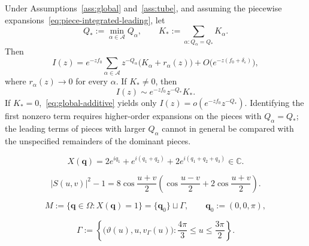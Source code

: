 \documentclass[10pt,a4paper]{amsart}
\newcommand{\C}{\mathbb{C}}
\newcommand{\cA}{\mathcal{A}}
\newcommand{\eps}{\varepsilon}
\begin{document}
\begin{theorem}\label{thm:global-leading}
Under Assumptions~\ref{ass:global} and~\ref{ass:tube}, and assuming the
piecewise expansions~\eqref{eq:piece-integrated-leading}, let
\begin{equation}\label{eq:Qstar}
  Q_*:=\min_{\alpha\in\cA}Q_\alpha,
  \qquad
  K_*:=\sum_{\alpha:Q_\alpha=Q_*}K_\alpha.
\end{equation}
Then
\begin{equation}\label{eq:global-additive}
 I(z)=e^{-zf_0}\sum_{\alpha\in\cA}
 z^{-Q_\alpha}\bigl(K_\alpha+r_\alpha(z)\bigr)
 +O\bigl(e^{-z(f_0+\delta_\eps)}\bigr),
\end{equation}
where $r_\alpha(z)\to0$ for every $\alpha$.  If $K_*\ne0$, then
\begin{equation}\label{eq:global-equivalence}
  I(z)\sim e^{-zf_0}z^{-Q_*}K_*.
\end{equation}
If $K_*=0$,~\eqref{eq:global-additive} yields only
$I(z)=o(e^{-zf_0}z^{-Q_*})$.  Identifying the first nonzero term requires
higher-order expansions on the pieces with $Q_\alpha=Q_*$; the leading
terms of pieces with larger $Q_\alpha$ cannot in general be compared with
the unspecified remainders of the dominant pieces.
\end{theorem}

\begin{equation}\label{eq:robot-forward-map}
 X(\bm q)
 =2e^{iq_1}+e^{i(q_1+q_2)}+2e^{i(q_1+q_2+q_3)}\in\C.
\end{equation}

\begin{equation}\label{eq:robot-shape-factorization}
 |S(u,v)|^2-1
 =8\cos\frac{u+v}{2}
 \left(
  \cos\frac{u-v}{2}+2\cos\frac{u+v}{2}
 \right).
\end{equation}

\begin{equation}\label{eq:robot-minimum-set}
 M:=\{\bm q\in\Omega:X(\bm q)=1\}
 =\{\bm q_0\}\sqcup\Gamma,
 \qquad
 \bm q_0:=(0,0,\pi),
\end{equation}

\begin{equation}\label{eq:robot-regular-arc}
 \Gamma:=\left\{
  \bigl(\vartheta(u),u,v_\Gamma(u)\bigr):
  \frac{4\pi}{3}\le u\le\frac{3\pi}{2}
 \right\}.
\end{equation}
\end{document}
